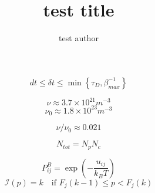 \documentclass[10pt, a4paper]{article}
\title{test title}
\author{test author}
\begin{document}
\begin{equation}
  dt \leq \delta t \leq \min \left\{\tau_D, \beta_{max}^{-1}\right\}
\end{equation}

\begin{equation}
\nu \approx 3.7\times 10^{21} m^{-3}
\end{equation}
\begin{equation}
\nu_0 \approx 1.8\times 10^{23} m^{-3}
\end{equation}

\begin{equation}
\nu/\nu_0 \approx 0.021
\end{equation}

\begin{equation}
N_{tot} = N_pN_c
\end{equation}

\begin{equation}
P^B_{ij} = \exp\left(-\frac{u_{ij}}{k_BT}\right)
\end{equation}
\begin{equation}
\mathscr{I}(p) = k \quad\textrm{if }F_j(k-1)\leq p <F_j(k)
\end{equation}
\end{document}
